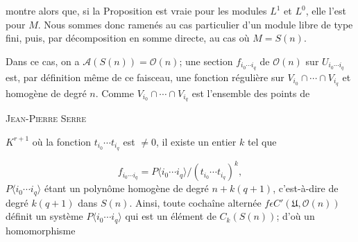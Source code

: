 \begin{center}
\end{center}
montre alors que, si la Proposition est vraie pour les modules $L^1$ et $L^0$, elle l'est pour $M$. Nous sommes donc ramenés au cas particulier d'un module libre de type fini, puis, par décomposition en somme directe, au cas où $M = S(n)$.

Dans ce cas, on a $\mathcal{A}(S(n)) = \mathcal{O}(n)$; une section $f_{i_0 \cdots i_q}$ de $\mathcal{O}(n)$ sur $U_{i_0 \cdots i_q}$ est, par définition même de ce faisceau, une fonction régulière sur $V_{i_0} \cap \cdots \cap V_{i_q}$ et homogène de degré $n$. Comme $V_{i_0} \cap \cdots \cap V_{i_q}$ est l'ensemble des points de




\textsc{Jean-Pierre Serre}

 $K^{r+1}$ où la fonction $t_{i_0} \cdots t_{i_q}$ est $\neq 0$, il existe un entier $k$ tel que

\begin{equation*}
f_{i_0 \cdots i_q} = P\langle i_0 \cdots i_q\rangle/(t_{i_0} \cdots t_{i_q})^k,
\end{equation*}
$P\langle i_0 \cdots i_q\rangle$ étant un polynôme homogène de degré $n + k(q + 1)$, c'est-à-dire de degré $k(q + 1)$ dans $S(n)$. Ainsi, toute cochaîne alternée $f \epsilon C'(\mathfrak{U}, \mathcal{O}(n))$ définit un système $P\langle i_0 \cdots i_q\rangle$ qui est un élément de $C_k(S(n))$; d'où un homomorphisme

